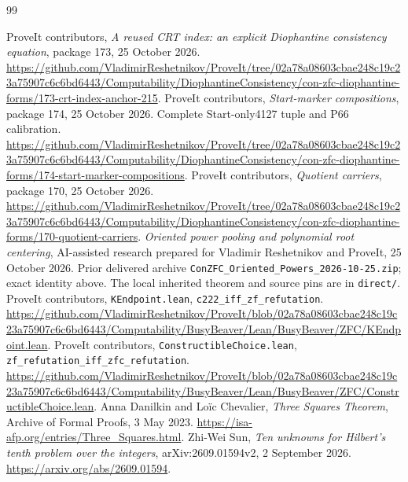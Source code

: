 \documentclass[11pt]{article}
\begin{document}
\begin{thebibliography}{99}
\raggedright
{}
ProveIt contributors, \emph{A reused CRT index: an explicit Diophantine
consistency equation}, package 173, 25 October 2026.
\url{https://github.com/VladimirReshetnikov/ProveIt/tree/02a78a08603cbae248c19c23a75907c6c6bd6443/Computability/DiophantineConsistency/con-zfc-diophantine-forms/173-crt-index-anchor-215}.
ProveIt contributors, \emph{Start-marker compositions}, package 174,
25 October 2026. Complete Start-only4127 tuple and P66 calibration.
\url{https://github.com/VladimirReshetnikov/ProveIt/tree/02a78a08603cbae248c19c23a75907c6c6bd6443/Computability/DiophantineConsistency/con-zfc-diophantine-forms/174-start-marker-compositions}.
ProveIt contributors, \emph{Quotient carriers}, package 170,
25 October 2026.
\url{https://github.com/VladimirReshetnikov/ProveIt/tree/02a78a08603cbae248c19c23a75907c6c6bd6443/Computability/DiophantineConsistency/con-zfc-diophantine-forms/170-quotient-carriers}.
\emph{Oriented power pooling and polynomial root centering},
AI-assisted research prepared for Vladimir Reshetnikov and ProveIt,
25 October 2026. Prior delivered archive
\texttt{ConZFC\_Oriented\_Powers\_2026-10-25.zip}; exact identity above.
The local inherited theorem and source pins are in \texttt{direct/}.
ProveIt contributors, \texttt{KEndpoint.lean},
\texttt{c222\_iff\_zf\_refutation}.
\url{https://github.com/VladimirReshetnikov/ProveIt/blob/02a78a08603cbae248c19c23a75907c6c6bd6443/Computability/BusyBeaver/Lean/BusyBeaver/ZFC/KEndpoint.lean}.
ProveIt contributors, \texttt{ConstructibleChoice.lean},
\texttt{zf\_refutation\_iff\_zfc\_refutation}.
\url{https://github.com/VladimirReshetnikov/ProveIt/blob/02a78a08603cbae248c19c23a75907c6c6bd6443/Computability/BusyBeaver/Lean/BusyBeaver/ZFC/ConstructibleChoice.lean}.
Anna Danilkin and Lo\"ic Chevalier,
\emph{Three Squares Theorem}, Archive of Formal Proofs, 3 May 2023.
\url{https://isa-afp.org/entries/Three_Squares.html}.
Zhi-Wei Sun, \emph{Ten unknowns for Hilbert's tenth problem over the
integers}, arXiv:2609.01594v2, 2 September 2026.
\url{https://arxiv.org/abs/2609.01594}.
\end{thebibliography}
\end{document}
